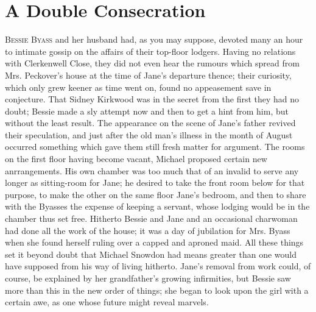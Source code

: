 \chapter{A Double Consecration}

\textsc{Bessie Byass} and her husband had, as you may suppose, devoted
many an hour to intimate gossip on the affairs of their top-floor
lodgers. Having no relations with Clerkenwell Close, they did not even
hear the rumours which spread from Mrs. Peckover's house at the time of
Jane's departure thence; their curiosity, which only grew keener as time
went on, found no appeasement save in conjecture. That Sidney Kirkwood
was in the secret from the first they had no doubt; Bessie made a sly
attempt now and then to get a hint from him, but without the least
result. The appearance on the scene of Jane's father revived their
speculation, and just after the old man's illness in the month of August
occurred something which gave them still fresh matter for
{\protect\hypertarget{246}{}{}}argument. The rooms on the first floor
having become vacant, Michael proposed certain new anrrangements. His
own chamber was too much that of an invalid to serve any longer as
sitting-room for Jane; he desired to take the front room below for that
purpose, to make the other on the same floor Jane's bedroom, and then to
share with the Byasses the expense of keeping a servant, whose lodging
would be in the chamber thus set free. Hitherto Bessie and Jane and an
occasional charwoman had done all the work of the house; it was a day of
jubilation for Mrs. Byass when she found herself ruling over a capped
and aproned maid. All these things set it beyond doubt that Michael
Snowdon had means greater than one would have supposed from his way of
living hitherto. Jane's removal from work could, of course, be explained
by her grandfather's growing infirmities, but Bessie saw more than this
in the new order of things; she began to look upon the girl with a
certain awe, as one whose future might reveal marvels.

